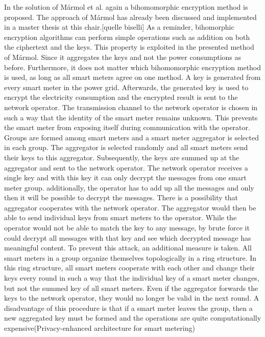 In the solution of Mármol et al. again a bihomomorphic encryption method is proposed. The approach of Mármol has already been discussed and implemented in a master thesis at this chair.[quelle biselli] As a reminder, bihomorphic encryption algorithms can perform simple operations such as addition on both the ciphertext and the keys. This property is exploited in the presented method of Mármol. Since it aggregates the keys and not the power consumptions as before. Furthermore, it does not matter which bihomomorphic encryption method is used, as long as all smart meters agree on one method. A key is generated from every smart meter in the power grid. Afterwards, the generated key is used to encrypt the electricity consumption and the encrypted result is sent to the network operator. The transmission channel to the network operator is chosen in such a way that the identity of the smart meter remains unknown. This prevents the smart meter from exposing itself during communication with the operator. Groups are formed among smart meters and a smart meter aggregator is selected in each group. The aggregator is selected randomly and all smart meters send their keys to this aggregator. Subsequently, the keys are summed up at the aggregator and sent to the network operator. The network operator receives a single key and with this key it can only decrypt the messages from one smart meter group. additionally, the operator has to add up all the messages and only then it will be possible to decrypt the messages. There is a possibility that aggregator cooperates with the network operator. The aggregator would then be able to send individual keys from smart meters to the operator. While the operator would not be able to match the key to any message, by brute force it could decrypt all messages with that key and see which decrypted message has meaningful content. To prevent this attack, an additional measure is taken. All smart meters in a group organize themselves topologically in a ring structure. In this ring structure, all smart meters cooperate with each other and change their keys every round in such a way that the individual key of a smart meter changes, but not the summed key of all smart meters. Even if the aggregator forwards the keys to the network operator, they would no longer be valid in the next round. A disadvantage of this procedure is that if a smart meter leaves the group, then a new aggregated key must be formed and the operations are quite computationally expensive(Privacy-enhanced architecture for smart metering)\\
